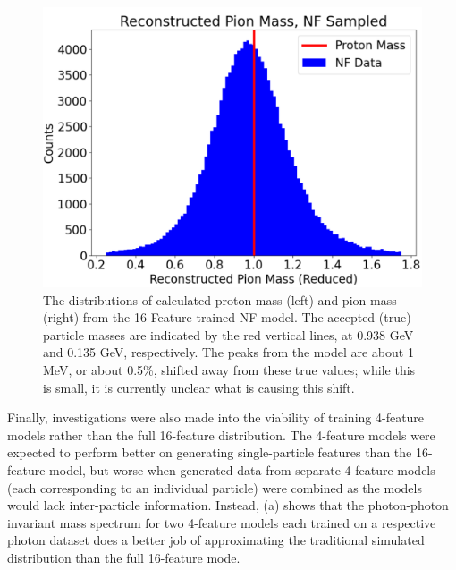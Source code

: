 \begin{figure}[H]
\begin{minipage}{0.421245\textwidth}
                \includegraphics[width=.97\textwidth,trim={ 0 0 0 0},clip]{Chapters/Ch3-Simulations/normalizing_flows/pics/FinalPictures/updated_pion_reduced.png}
            \end{minipage}
                \caption[Generated Proton and Pion Mass Distributions]{The distributions of calculated proton mass (left) and pion mass (right) from the 16-Feature trained NF model.  The accepted (true) particle masses are indicated by the red vertical lines, at 0.938 GeV and 0.135 GeV, respectively.
                The peaks from the model are about 1 MeV, or about 0.5\%, shifted away from these true values; while this is small, it is currently unclear what is causing this shift.}
            \label{fig:protonspions}
        \end{figure}
        

        Finally, investigations were also made into the viability of training 4-feature models rather than the full 16-feature distribution. The 4-feature models were expected to perform better on generating single-particle features than the 16-feature model, but worse when generated data from separate 4-feature models (each corresponding to an individual particle) were combined as the models would lack inter-particle information. Instead,  (a) shows that the photon-photon invariant mass spectrum for two 4-feature models each trained on a respective photon dataset does a better job of approximating the traditional simulated distribution than the full 16-feature mode. 
        
